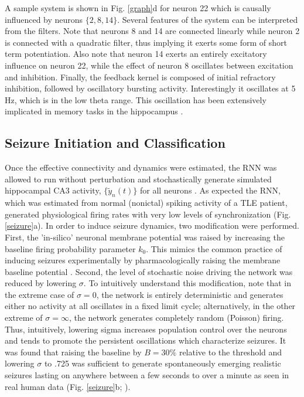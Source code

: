 \documentclass[11pt,a4paper,final]{article}
\begin{document}
A sample system is shown in Fig. \ref{graph}d for neuron 22 which is causally influenced by neurons $\{2,8,14\}$.
Several features of the system can be interpreted from the filters.
Note that neurons 8 and 14 are connected linearly while neuron 2 is connected with a quadratic filter, thus implying it exerts some form of short term potentiation.
Also note that neuron 14 exerts an entirely excitatory influence on neuron 22, while the effect of neuron 8 oscillates between excitation and inhibition.
Finally, the feedback kernel is composed of initial refractory inhibition, followed by oscillatory bursting activity.
Interestingly it oscillates at 5 Hz, which is in the low theta range. 
This oscillation has been extensively implicated in memory tasks in the hippocampus \citep{buzsaki06,sandler14}.

    \subsection{Seizure Initiation and Classification}

Once the effective connectivity and dynamics were estimated, the RNN was allowed to run without perturbation and stochastically generate simulated hippocampal CA3 activity, $\{\tilde{y}_n(t)\}$ for all \nn{} neurons \citep{pillow08}.
As expected the RNN, which was estimated from normal (nonictal) spiking activity of a TLE patient, generated physiological firing rates with very low levels of synchronization (Fig. \ref{seizure}a).
In order to induce seizure dynamics, two modification were performed.
First, the 'in-silico' neuronal membrane potential was raised by increasing the baseline firing probability parameter $k_0$.
This mimics the common practice of inducing seizures experimentally by pharmacologically raising the membrane baseline potential \citep{fricker99,avoli02}.
Second, the level of stochastic noise driving the network was reduced by lowering $\sigma$.
To intuitively understand this modification, note that in the extreme case of $\sigma=0$, the network is entirely deterministic and generates either no activity at all oscillates in a fixed limit cycle;
alternatively, in the other extreme of $\sigma=\infty$, the network generates completely random (Poisson) firing.
Thus, intuitively, lowering sigma increases population control over the neurons and tends to promote the persistent oscillations which characterize seizures.
It was found that raising the baseline by $B=30\%$ relative to the threshold and lowering $\sigma$ to .725 was sufficient to generate spontaneously emerging realistic seizures lasting on anywhere between a few seconds to over a minute as seen in real human data (Fig. \ref{seizure}b; \citet{bower12,truccolo14}).	
\end{document}
